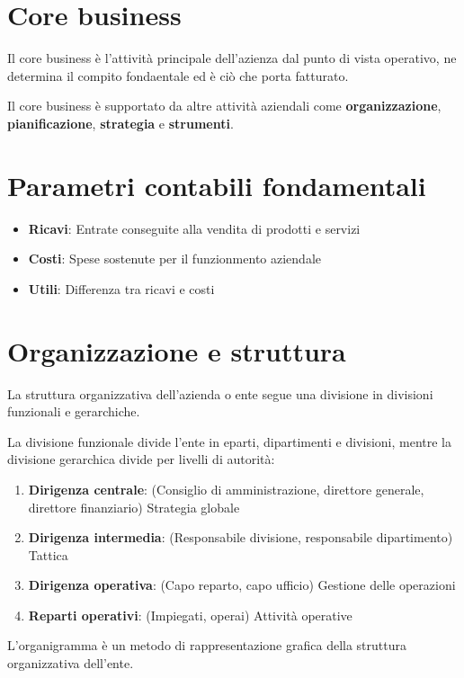 \section{Core business}

Il core business è l'attività principale dell'azienza dal punto di vista operativo,
ne determina il compito fondaentale ed è ciò che porta fatturato.

Il core business è supportato da altre attività aziendali come \textbf{organizzazione},
\textbf{pianificazione}, \textbf{strategia} e \textbf{strumenti}.

\section{Parametri contabili fondamentali}

\begin{itemize}
  \item \textbf{Ricavi}: Entrate conseguite alla vendita di prodotti e servizi
  \item \textbf{Costi}: Spese sostenute per il funzionmento aziendale
  \item \textbf{Utili}: Differenza tra ricavi e costi
\end{itemize}


\section{Organizzazione e struttura}
La struttura organizzativa dell'azienda o ente segue una divisione in divisioni funzionali e gerarchiche.


La divisione funzionale divide l'ente in eparti, dipartimenti e divisioni, mentre la divisione gerarchica
divide per livelli di autorità:
\begin{enumerate}
  \item \textbf{Dirigenza centrale}: (Consiglio di amministrazione, direttore generale, direttore finanziario) Strategia globale
  \item \textbf{Dirigenza intermedia}: (Responsabile divisione, responsabile dipartimento) Tattica
  \item \textbf{Dirigenza operativa}: (Capo reparto, capo ufficio) Gestione delle operazioni
  \item \textbf{Reparti operativi}: (Impiegati, operai) Attività operative
\end{enumerate}

L'organigramma è un metodo di rappresentazione grafica della struttura organizzativa dell'ente.

